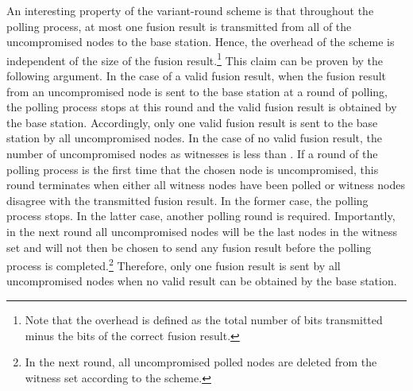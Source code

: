 \documentclass[12pt, onecolumn, draftcls]{IEEEtran}
\begin{document}
An interesting property of the variant-round scheme is that
throughout the polling process, at most one fusion result is
transmitted from all of the uncompromised nodes to the base station.
Hence, the overhead of the scheme is independent of the size of the
fusion result.\footnote{Note that the overhead is defined as the
total number of bits transmitted minus the bits of the correct
fusion result.} This claim can be proven by the following argument.
In the case of a valid fusion result, when the fusion result from an
uncompromised node is sent to the base station at a round of
polling, the polling process stops at this round and the valid
fusion result is obtained by the base station. Accordingly, only one
valid fusion result is sent to the base station by all uncompromised
nodes. In the case of no valid fusion result, the number of
uncompromised nodes as witnesses is less than . If a round of the
polling process is the first time that the chosen node is
uncompromised, this round terminates when either all witness nodes
have been polled or  witness nodes disagree with the
transmitted fusion result. In the former case, the polling process
stops. In the latter case, another polling round is required.
Importantly, in the next round all uncompromised nodes will be the
last  nodes in the witness set and will not then be chosen to
send any fusion result before the polling process is
completed.\footnote{In the next round, all uncompromised polled
nodes are deleted from the witness set according to the scheme.}
Therefore, only one fusion result is sent by all uncompromised nodes
when no valid result can be obtained by the base station.
\end{document}

